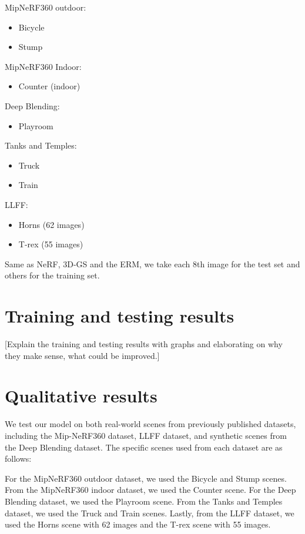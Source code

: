 \documentclass[12pt]{report}
\begin{document}
MipNeRF360 outdoor:
\begin{itemize}
    \item Bicycle 
    \item Stump
\end{itemize}

MipNeRF360 Indoor:
\begin{itemize}
    \item Counter (indoor)
\end{itemize}

Deep Blending:
\begin{itemize}
    \item Playroom
\end{itemize}

Tanks and Temples:
\begin{itemize}
    \item Truck
    \item Train
\end{itemize}

LLFF:
\begin{itemize}
    \item Horns (62 images)
    \item T-rex (55 images)
\end{itemize}

Same as NeRF, 3D-GS and the ERM, we take each 8th image for the test set and others for the training set.

\section{Training and testing results}
[Explain the training and testing results with graphs and elaborating on why they make sense, what could be improved.]

\section{Qualitative results}
We test our model on both real-world scenes from previously published datasets, including the Mip-NeRF360 dataset, LLFF dataset, and synthetic scenes from the Deep Blending dataset. The specific scenes used from each dataset are as follows: 

For the MipNeRF360 outdoor dataset, we used the Bicycle and Stump scenes. From the MipNeRF360 indoor dataset, we used the Counter scene. For the Deep Blending dataset, we used the Playroom scene. From the Tanks and Temples dataset, we used the Truck and Train scenes. Lastly, from the LLFF dataset, we used the Horns scene with 62 images and the T-rex scene with 55 images.
\end{document}
